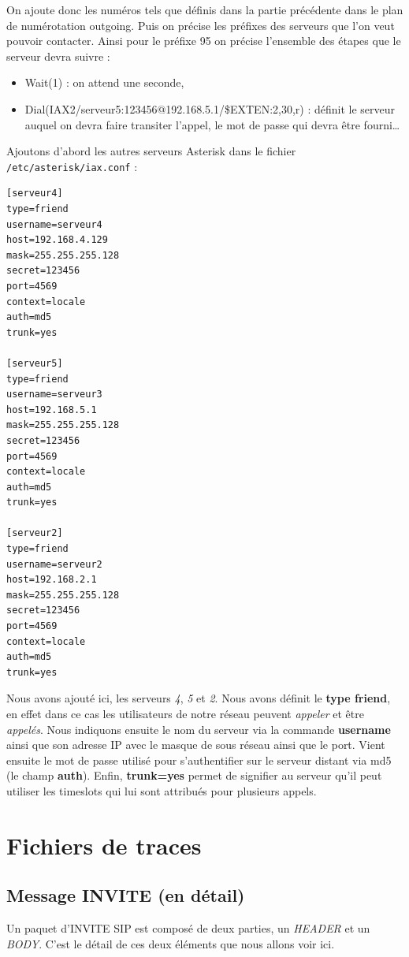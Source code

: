\documentclass[12pt,a4paper,notitlepage]{article}
\begin{document}
On ajoute donc les numéros tels que définis dans la partie précédente dans le plan de numérotation outgoing. Puis on précise les préfixes des serveurs que l'on veut pouvoir contacter. Ainsi pour le préfixe 95 on précise l'ensemble des étapes que le serveur devra suivre :
\begin{itemize}
\item Wait(1) : on attend une seconde,
\item Dial(IAX2/serveur5:123456@192.168.5.1/\${EXTEN:2},30,r) : définit le serveur auquel on devra faire transiter l'appel, le mot de passe qui devra être fourni\ldots
\end{itemize}\bigskip


Ajoutons d'abord les autres serveurs Asterisk dans le fichier
\texttt{/etc/asterisk/iax.conf} :

\begin{lstlisting}[title=Fichier IAX.conf]
[serveur4]
type=friend
username=serveur4
host=192.168.4.129
mask=255.255.255.128
secret=123456
port=4569
context=locale
auth=md5
trunk=yes

[serveur5]
type=friend
username=serveur3
host=192.168.5.1
mask=255.255.255.128
secret=123456
port=4569
context=locale
auth=md5
trunk=yes

[serveur2]
type=friend
username=serveur2
host=192.168.2.1
mask=255.255.255.128
secret=123456
port=4569
context=locale
auth=md5
trunk=yes
\end{lstlisting}
Nous avons ajouté ici, les serveurs \textit{4}, \textit{5} et \textit{2}. Nous avons définit le \textbf{type friend}, en effet dans ce cas les utilisateurs de notre réseau peuvent \textit{appeler} et être \textit{appelés}. Nous indiquons ensuite le nom du serveur via la commande \textbf{username} ainsi que son adresse IP avec le masque de sous réseau ainsi que le port. Vient ensuite le mot de passe utilisé pour s'authentifier sur le serveur distant via md5 (le champ \textbf{auth}). Enfin, \textbf{trunk=yes} permet de signifier au serveur qu'il peut utiliser les timeslots qui lui sont attribués pour plusieurs appels.

\section{Fichiers de traces}
\subsection{Message INVITE (en détail)}
Un paquet d'INVITE SIP est composé de deux parties, un \textit{HEADER} et un  \textit{BODY}. C'est le détail de ces deux éléments que nous allons voir ici. 
\end{document}
